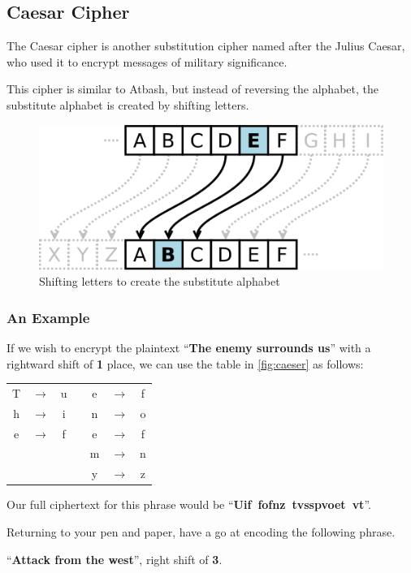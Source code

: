 \subsection{Caesar Cipher}
	
	The Caesar cipher is another substitution cipher named after the Julius Caesar, who used it to encrypt messages of military significance.
	
	This cipher is similar to Atbash, but instead of reversing the alphabet, the substitute alphabet is created by shifting letters.
	
	\begin{figure}[h]
		\centering
		\includegraphics[width=0.5\linewidth]{McrRaspJam/016_Ciphers/2_caesar/caesarshift}
		\caption{Shifting letters to create the substitute alphabet}
		\label{fig:caesardiagram}
	\end{figure}
	
	\subsubsection{An Example}
	
		If we wish to encrypt the plaintext ``\textbf{The enemy surrounds us}'' with a rightward shift of \textbf{1} place, we can use the table in \autoref{fig:caeser} as follows:
		
		\begin{tabular}{ccccccc}
			T & $\rightarrow$ & u && e & $\rightarrow$ & f \\ 
			h & $\rightarrow$ & i && n & $\rightarrow$ & o \\ 
			e & $\rightarrow$ & f && e & $\rightarrow$ & f\\ 
			 & & && m & $\rightarrow$ & n\\ 
			 & & && y & $\rightarrow$ & z\\
		\end{tabular}
	
		Our full ciphertext for this phrase would be ``\mbox{\textbf{Uif fofnz tvsspvoet vt}}''.
		
		Returning to your pen and paper, have a go at encoding the following phrase.
		
		``\textbf{Attack from the west}'', right shift of \textbf{3}.
		
